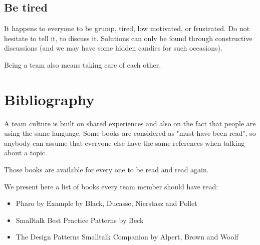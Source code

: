 \documentclass[10pt]{article}
\begin{document}
\subsection{Be tired}

It happens to everyone to be grump, tired, low motivated, or frustrated. Do not hesitate to tell it, to discuss it. Solutions can only be found through constructive discussions (and we may have some hidden candies for such occasions).

Being a team also means taking care of each other.

\section{Bibliography}

A team culture is built on shared experiences and also on the fact that people are using the same language.
Some books are considered as "must have been read", so anybody can assume that everyone else have the same references when talking about a topic.

Those books are available for every one to be read and read again.

We present here a list of books every team member should have read:
\begin{itemize}
\item Pharo by Example by Black, Ducasse, Nierstasz and Pollet
\item Smalltalk Best Practice Patterns by Beck
\item The Design Patterns Smalltalk Companion by Alpert, Brown and Woolf
\end{itemize}
\end{document}
